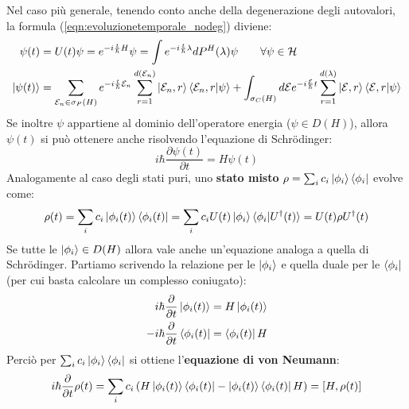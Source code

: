 \documentclass[../../FisicaTeorica.tex]{subfiles}
\begin{document}
Nel caso più generale, tenendo conto anche della degenerazione degli autovalori, la formula (\ref{eqn:evoluzionetemporale_nodeg}) diviene:
\begin{align}
    \psi(t)&=U(t)\psi = e^{-i\frac{t}{\hbar}H}\psi=\int e^{-i\frac{t}{\hbar}\lambda}dP^H(\lambda)\psi \qquad \forall \psi \in \mathcal{H}\nonumber\\
    \ket{\psi(t)} &= \sum_{\mathcal{E}_n\in \sigma_P(H)} e^{-i\frac{t}{\hbar}\mathcal{E}_n}\sum_{r=1}^{d(\mathcal{E}_n)}\ket{\mathcal{E}_{n},r}\braket{\mathcal{E}_{n},r|\psi}
+\int_{\sigma_C(H)}d\mathcal{E} e^{-i\frac{\mathcal{E}}{\hbar}t}\sum_{r=1}^{d(\lambda)}\ket{\mathcal{E},r}\braket{\mathcal{E},r|\psi}
\end{align}
Se inoltre $\psi$ appartiene al dominio dell'operatore energia ($\psi \in D(H)$), allora $\psi(t)$ si può ottenere anche risolvendo l'equazione di Schrödinger:
\[
i\hbar \frac{\partial \psi(t)}{\partial t}=H\psi(t)
\]
Analogamente al caso degli stati puri,  uno \textbf{stato misto} $\rho=\sum_i c_i\ket{\phi_i}\bra{\phi_i}$ evolve come:
\[
\rho(t)=\sum_i c_i\ket{\phi_i(t)}\bra{\phi_i(t)}=\sum_i c_i U(t)\ket{\phi_i}\braket{\phi_i|U^\dag(t)}=U(t)\rho U^\dag(t)
\]
Se tutte le $\ket{\phi_i}\in D(H)$ allora vale anche un'equazione analoga a quella di Schrödinger. Partiamo scrivendo la relazione per le $\ket{\phi_i}$ e quella duale per le $\bra{\phi_i}$ (per cui basta calcolare un complesso coniugato):
\begin{align*}
i\hbar \frac{\partial}{\partial t}\ket{\phi_i(t)} &= H\ket{\phi_i(t)}\\
-i\hbar \frac{\partial}{\partial t}\bra{\phi_i(t)}&=\bra{\phi_i(t)}H
\end{align*}
Perciò per $\sum_i c_i \ket{\phi_i}\bra{\phi_i}$ si ottiene l'\textbf{equazione di von Neumann}:\\
\begin{equation}
i\hbar \frac{\partial}{\partial t}\rho(t) = \sum_i c_i\left(H\ket{\phi_i(t)}\bra{\phi_i(t)}-\ket{\phi_i(t)}\bra{\phi_i(t)}H \right) = [H,\rho(t)]
\end{equation}
\end{document}
